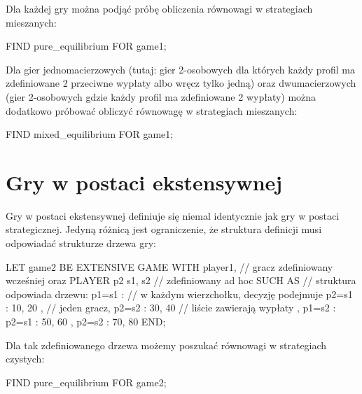 \documentclass[polish]{standalone}
\begin{document}
Dla każdej gry można podjąć próbę obliczenia równowagi w strategiach mieszanych:

\begin{gtl}
FIND pure_equilibrium FOR game1;
\end{gtl}

Dla gier jednomacierzowych (tutaj: gier 2-osobowych dla których każdy profil ma zdefiniowane 2 przeciwne wypłaty albo
wręcz tylko jedną) oraz dwumacierzowych (gier 2-osobowych gdzie każdy profil ma zdefiniowane 2 wypłaty) można dodatkowo
próbować obliczyć równowagę w strategiach mieszanych:

\begin{gtl}
FIND mixed_equilibrium FOR game1;
\end{gtl}

\section{Gry w postaci ekstensywnej}

Gry w postaci ekstensywnej definiuje się niemal identycznie jak gry w postaci strategicznej. Jedyną różnicą jest
ograniczenie, że struktura definicji musi odpowiadać strukturze drzewa gry:

\begin{gtl}
LET game2 BE
  EXTENSIVE GAME
  WITH
    player1, // gracz zdefiniowany wcześniej oraz
    PLAYER p2 { s1, s2 } // zdefiniowany ad hoc
  SUCH AS      // struktura odpowiada drzewu:
    { p1=s1 :  // w każdym wierzchołku, decyzję podejmuje
      { p2=s1 : 10, 20 }, // jeden gracz,
      { p2=s2 : 30, 40 }  // liście zawierają wypłaty
    },
    { p1=s2 :
      { p2=s1 : 50, 60 },
      { p2=s2 : 70, 80 }
    }
  END;
\end{gtl}

Dla tak zdefiniowanego drzewa możemy poszukać równowagi w strategiach czystych:

\begin{gtl}
FIND pure_equilibrium FOR game2;
\end{gtl}
\end{document}
